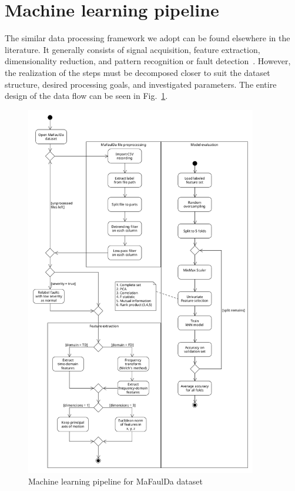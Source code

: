 \section{Machine learning pipeline}
The similar data processing framework we adopt can be found elsewhere in the literature. It generally consists of signal acquisition, feature extraction, dimensionality reduction, and pattern recognition or fault detection~\cite{wang_bearing_2015}. However, the realization of the steps must be decomposed closer to suit the dataset structure, desired processing goals, and investigated parameters. The entire design of the data flow can be seen in Fig.~\ref{fig:design:ml-pipeline}.

\begin{figure}[h]
    \centering
	\includegraphics[width=0.9\textwidth]{assets/design/pipeline-design.png}
	\caption{Machine learning pipeline for MaFaulDa dataset}
	\label{fig:design:ml-pipeline}
\end{figure}
\afterpage{\clearpage}

